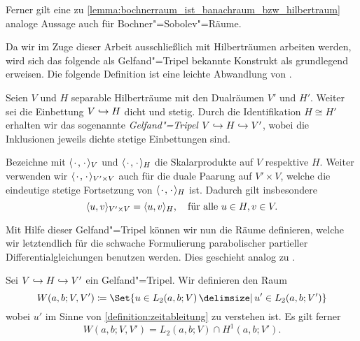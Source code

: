 Ferner gilt eine zu \cref{lemma:bochnerraum_ist_banachraum_bzw_hilbertraum} analoge Aussage auch für Bochner"=Sobolev"=Räume.

Da wir im Zuge dieser Arbeit ausschließlich mit Hilberträumen arbeiten werden, wird sich das folgende als Gelfand"=Tripel bekannte Konstrukt als grundlegend erweisen.
Die folgende Definition ist eine leichte Abwandlung von \cite[Abschnitt 10.2]{Schweizer2013}.

\begin{Definition}
\label{definition:gelfand_tripel}
    Seien $V$ und $H$ separable Hilberträume mit den Dualräumen $V'$ und $H'$.
    Weiter sei die Einbettung $V \denseinclusion H$ dicht und stetig.
    Durch die Identifikation $H \cong H'$ erhalten wir das sogenannte \emph{Gelfand"=Tripel} $V \denseinclusion H \denseinclusion V'$, wobei die Inklusionen jeweils dichte stetige Einbettungen sind.
\end{Definition}

\begin{Bemerkung}
\label{bemerkung:skalarprodukte_und_duality_pairing}
    Bezeichne mit $\skp{\blank}{\blank}{V}$ und $\skp{\blank}{\blank}{H}$ die Skalarprodukte auf $V$ respektive $H$.
    Weiter verwenden wir $\skp{\blank}{\blank}{V' \times V}$ auch für die duale Paarung auf $V' \times V$, welche die eindeutige stetige Fortsetzung von $\skp{\blank}{\blank}{H}$ ist.
    Dadurch gilt insbesondere
    \begin{equation}
        \skp{u}{v}{V' \times V} = \skp{u}{v}{H}, \quad \fa u \in H, v \in V.
    \end{equation}
\end{Bemerkung}

Mit Hilfe dieser Gelfand"=Tripel können wir nun die Räume definieren, welche wir letztendlich für die schwache Formulierung parabolischer partieller Differentialgleichungen benutzen werden.
Dies geschieht analog zu \cite[Definition XVIII.2.4]{Dautray:1992by}.

\begin{Definition}
\label{definition:bochner_raum_W}
    Sei $V \denseinclusion H \denseinclusion V'$ ein Gelfand"=Tripel.
    Wir definieren den Raum
    \begin{equation}
        W(a, b; V, V') \deq \Set{u \in L_{2}(a, b; V) \given u' \in L_{2}(a, b; V')}
    \end{equation}
    wobei $u'$ im Sinne von \cref{definition:zeitableitung} zu verstehen ist.
    Es gilt ferner
    \begin{equation}
        W(a, b; V, V') = L_{2}(a, b; V) \cap H^{1}(a, b; V').
    \end{equation}
\end{Definition}

